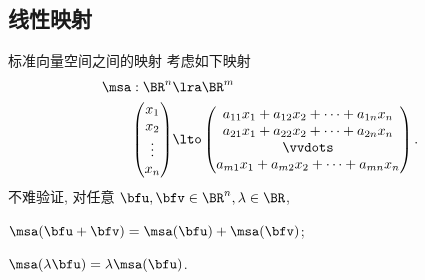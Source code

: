 \subsection{线性映射}
\begin{frame}{标准向量空间之间的映射\noexer}
	\onslide<+->
	考虑如下映射
	\begin{align*}
		\msa:\BR^n&\lra\BR^m\\
		\begin{pmatrix}
			x_1\\
			x_2\\
			\vdots\\
			x_n
		\end{pmatrix}&\lto
		\begin{pmatrix}
			a_{11}x_1+a_{12}x_2+\cdots+a_{1n}x_n\\
			a_{21}x_1+a_{22}x_2+\cdots+a_{2n}x_n\\
			\vvdots\\
			a_{m1}x_1+a_{m2}x_2+\cdots+a_{mn}x_n
		\end{pmatrix}.
	\end{align*}
	\onslide<+->
	不难验证, 对任意 $\bfu,\bfv\in\BR^n,\lambda\in\BR$,
	\begin{enumV}[L]
		\item $\msa(\bfu+\bfv)=\msa(\bfu)+\msa(\bfv)$;
		\item $\msa(\lambda\bfu)=\lambda \msa(\bfu)$.
	\end{enumV}
\end{frame}



